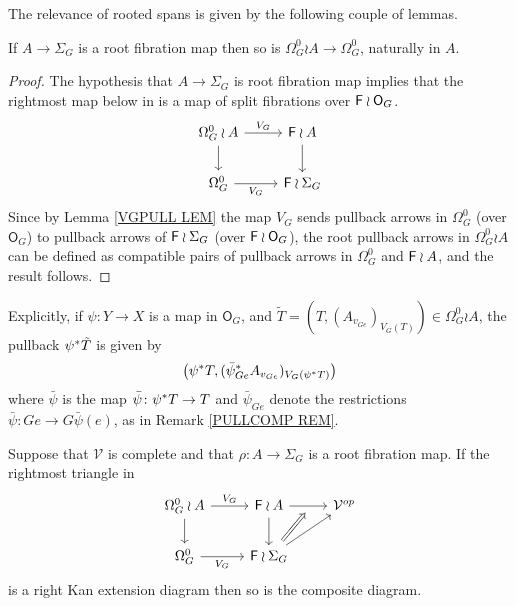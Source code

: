 \documentclass[a4paper,10pt]{article}%
\begin{document}
The relevance of rooted spans is given by the following couple of lemmas.

\begin{lemma}\label{ROOTFIBPULL LEM}
If $A \to \Sigma_G$ is a root fibration map then so is 
$\Omega_G^0 \wr A \to \Omega_G^0$, naturally in $A$.
\end{lemma}

\begin{proof}
The hypothesis that $A \to \Sigma_G$ is root fibration map
implies that the rightmost map below in 
is a map of split fibrations over
$\mathsf{F} \wr \mathsf{O}_G$.
\begin{equation}\label{ROOTIMPLIESROOT EQ}
\begin{tikzcd}
	\Omega_{G}^0 \wr A \ar{r}{V_G} \ar{d} &
	\Fin \wr A \ar{d}
\\
	\Omega_{G}^0 \ar{r}[swap]{V_G} &
	\Fin \wr \Sigma_G
\end{tikzcd}
\end{equation}
Since by Lemma \ref{VGPULL LEM} the map $V_G$ sends pullback  arrows in $\Omega_{G}^0$
(over $\mathsf{O}_G$) to pullback arrows of $\mathsf{F} \wr \Sigma_G$ (over $\mathsf{F} \wr \mathsf{O}_G$), 
the root pullback arrows in 
$\Omega_G^0 \wr A$ can be defined as compatible pairs of pullback arrows in $\Omega^0_G$ and $\mathsf{F} \wr A$,
and the result follows.
\end{proof}


\begin{remark}
Explicitly, if $\psi \colon Y \to X$ is a map in $\mathsf{O}_G$,
and $\tilde{T} =(T,(A_{v_{Ge}})_{V_G(T)}) \in \Omega_G^0 \wr A$,
the pullback $\psi^{\**} \tilde{T}$ is given by
\[
\left(\psi^{\**}T,(\bar{\psi}^{\**}_{Ge}
 A_{v_{Ge}})_{V_G(\psi^{\**}T)}\right)
\]
where $\bar{\psi}$ is the map 
$\bar{\psi} \colon \psi^{\**}T \to T$
and $\bar{\psi}_{G e}$ denote the restrictions
$\bar{\psi} \colon G e \to G \bar{\psi}(e)$, 
as in Remark \ref{PULLCOMP REM}.
\end{remark}


\begin{lemma}\label{LANPULLCOMA LEM}
	Suppose that $\mathcal{V}$ is complete and that $\rho \colon A \to \Sigma_G$ is a root fibration map. If the rightmost triangle in 
	\begin{equation}
	\begin{tikzcd}
		\Omega_{G}^{0} \wr A \ar{r}{V_G} 
		\ar{d} & 
		\Fin \wr A  
		\ar{d}  \ar{r}[swap,name=F]{}&
		\mathcal{V}^{op}
	\\
		\Omega_{G}^{0} \ar{r}[swap]{V_G} & 
		|[alias=FEG]|\Fin \wr \Sigma_G \ar{ru}
	\arrow[Rightarrow, from=FEG, to=F,shorten <=0.15cm]
	\end{tikzcd}
	\end{equation}
is a right Kan extension diagram then so is the composite diagram.
\end{lemma}
\end{document}
